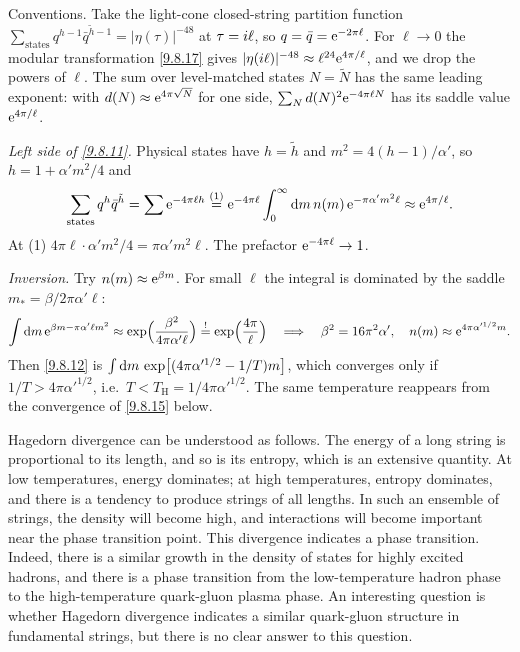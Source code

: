 \begin{tcolorbox}[breakable]
	\begin{remark}
		Conventions. Take the light-cone closed-string partition function $\sum_{\text{states}}q^{h-1}\bar q^{\tilde h-1}=|\eta(\tau)|^{-48}$ at $\tau=i\ell$, so $q=\bar q=\mathrm{e}^{-2\pi\ell}$. For $\ell\to0$ the modular transformation \eqref{9.8.17} gives $|\eta(i\ell)|^{-48}\approx\ell^{24}\mathrm{e}^{4\pi/\ell}$, and we drop the powers of $\ell$. The sum over level-matched states $N=\tilde N$ has the same leading exponent: with $d(N)\approx\mathrm{e}^{4\pi\sqrt N}$ for one side, $\sum_Nd(N)^2\mathrm{e}^{-4\pi\ell N}$ has its saddle value $\mathrm{e}^{4\pi/\ell}$.

		\emph{Left side of \eqref{9.8.11}.} Physical states have $h=\tilde h$ and $m^2=4(h-1)/\alpha'$, so $h=1+\alpha'm^2/4$ and
		\begin{equation*}
			\sum_{\text{states}}q^{h}\bar q^{\tilde h}=\sum\mathrm{e}^{-4\pi\ell h}\overset{(1)}{=}\mathrm{e}^{-4\pi\ell}\int_0^\infty\mathrm{d} m\,n(m)\,\mathrm{e}^{-\pi\alpha'm^2\ell}\approx\mathrm{e}^{4\pi/\ell} .
		\end{equation*}
		At (1) $4\pi\ell\cdot\alpha'm^2/4=\pi\alpha'm^2\ell$. The prefactor $\mathrm{e}^{-4\pi\ell}\to1$.

		\emph{Inversion.} Try $n(m)\approx\mathrm{e}^{\beta m}$. For small $\ell$ the integral is dominated by the saddle $m_*=\beta/2\pi\alpha'\ell$:
		\begin{equation*}
			\int\mathrm{d} m\,\mathrm{e}^{\beta m-\pi\alpha'\ell m^2}\approx\exp\Bigl(\frac{\beta^2}{4\pi\alpha'\ell}\Bigr)\overset{!}{=}\exp\Bigl(\frac{4\pi}{\ell}\Bigr)\quad\Longrightarrow\quad\beta^2=16\pi^2\alpha',\quad n(m)\approx\mathrm{e}^{4\pi\alpha'^{1/2}m} .
		\end{equation*}
		Then \eqref{9.8.12} is $\int\mathrm{d} m\,\exp[(4\pi\alpha'^{1/2}-1/T)m]$, which converges only if $1/T>4\pi\alpha'^{1/2}$, i.e.\ $T<T_{\mathrm H}=1/4\pi\alpha'^{1/2}$. The same temperature reappears from the convergence of \eqref{9.8.15} below.
	\end{remark}
\end{tcolorbox}
Hagedorn divergence can be understood as follows. The energy of a long string is proportional to its length, and so is its entropy, which is an extensive quantity. At low temperatures, energy dominates; at high temperatures, entropy dominates, and there is a tendency to produce strings of all lengths. 
In such an ensemble of strings, the density will become high, and interactions will become important near the phase transition point.
This divergence indicates a phase transition. Indeed, there is a similar growth in the density of states for highly excited hadrons, and there is a phase transition from the low-temperature hadron phase to the high-temperature quark-gluon plasma phase. 
An interesting question is whether Hagedorn divergence indicates a similar quark-gluon structure in fundamental strings, but there is no clear answer to this question. 

